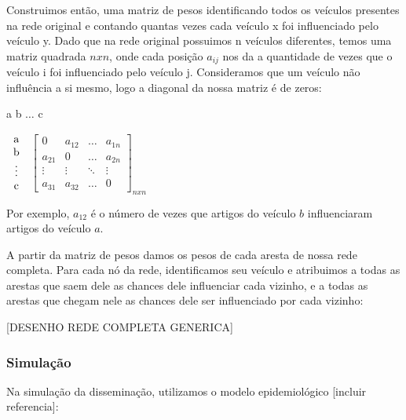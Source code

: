 \documentclass[a4paper,12pt]{article}
\begin{document}
 Construimos então, uma matriz de pesos identificando todos os veículos presentes na rede original e contando quantas vezes
 cada veículo x foi influenciado pelo veículo y. Dado que na rede original possuimos n
 veículos diferentes, temos uma matriz quadrada $nxn$, onde cada posição $a_{ij}$ nos da a quantidade de vezes que o veículo i foi influenciado
 pelo veículo j. Consideramos que um veículo não influência a si mesmo, logo a diagonal da nossa matriz é de zeros:
 \pagebreak
 
 \begin{center}
 \hspace{0.2cm}a \hspace{0.5cm} b \hspace{0.3cm} $\hdots$ \hspace{0.4cm}c
 
 \vspace{0.2cm}
 $
 \begin{tabular}{c}
   a \\
   b \\
   \vdots\\
   c
 \end{tabular}
$
 $
 \begin{bmatrix}
  0 & a_{12} & \hdots & a_{1n}\\
  a_{21} & 0 & \hdots & a_{2n}\\
  \vdots & \vdots & \ddots & \vdots\\
  a_{31} & a_{32} & \hdots & 0
 \end{bmatrix}_{nxn}
$

\end{center}

\vspace{0.4cm}
Por exemplo, $a_{12}$ é o número de vezes que artigos do veículo $b$ influenciaram artigos do veículo $a$.

A partir da matriz de pesos damos os pesos de cada aresta de nossa rede completa. Para cada nó da rede, identificamos seu veículo e atribuimos
a todas as arestas que saem dele as chances dele influenciar cada vizinho, e a todas as arestas que chegam nele as chances dele ser influenciado
por cada vizinho:

[DESENHO REDE COMPLETA GENERICA]

\subsubsection{Simulação}

 Na simulação da disseminação, utilizamos o modelo epidemiológico [incluir referencia]:
\end{document}
